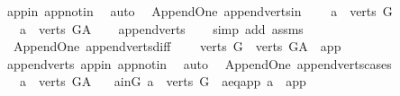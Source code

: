 \begin{isabellebody}
\ app{\isacharunderscore}{\kern0pt}in\ app{\isacharunderscore}{\kern0pt}notin\ \isamarkupfalse%
\ auto%
\endisatagproof
{\isafoldproof}%
%
\isadelimproof
\isanewline
%
\endisadelimproof
\isanewline
{}\isamarkupfalse%
\ {\isacharparenleft}{\kern0pt}\ Append{\isacharunderscore}{\kern0pt}One{\isacharparenright}{\kern0pt}\ append{\isacharunderscore}{\kern0pt}verts{\isacharunderscore}{\kern0pt}in{\isacharcolon}{\kern0pt}\ \isanewline
\ \ \ {\isachardoublequoteopen}a\ {\isasymin}\ verts\ G{\isachardoublequoteclose}\isanewline
\ \ \ {\isachardoublequoteopen}a\ {\isasymin}\ verts\ G{\isacharunderscore}{\kern0pt}A{\isachardoublequoteclose}\isanewline
%
\isadelimproof
\ \ %
\endisadelimproof
%
\isatagproof
{}\isamarkupfalse%
\ append{\isacharunderscore}{\kern0pt}verts\isanewline
\ \ \isamarkupfalse%
\ {\isacharparenleft}{\kern0pt}simp\ add{\isacharcolon}{\kern0pt}\ assms{\isacharparenright}{\kern0pt}%
\endisatagproof
{\isafoldproof}%
%
\isadelimproof
\ \isanewline
%
\endisadelimproof
\isanewline
{}\isamarkupfalse%
\ {\isacharparenleft}{\kern0pt}\ Append{\isacharunderscore}{\kern0pt}One{\isacharparenright}{\kern0pt}\ append{\isacharunderscore}{\kern0pt}verts{\isacharunderscore}{\kern0pt}diff{\isacharcolon}{\kern0pt}\ \isanewline
\ \ \ {\isachardoublequoteopen}verts\ G\ {\isacharequal}{\kern0pt}\ verts\ G{\isacharunderscore}{\kern0pt}A\ {\isacharminus}{\kern0pt}\ {\isacharbraceleft}{\kern0pt}app{\isacharbraceright}{\kern0pt}{\isachardoublequoteclose}\isanewline
%
\isadelimproof
\ \ %
\endisadelimproof
%
\isatagproof
{}\isamarkupfalse%
\ append{\isacharunderscore}{\kern0pt}verts\ app{\isacharunderscore}{\kern0pt}in\ app{\isacharunderscore}{\kern0pt}notin\ \isamarkupfalse%
\ auto%
\endisatagproof
{\isafoldproof}%
%
\isadelimproof
\isanewline
%
\endisadelimproof
\isanewline
{}\isamarkupfalse%
\ {\isacharparenleft}{\kern0pt}\ Append{\isacharunderscore}{\kern0pt}One{\isacharparenright}{\kern0pt}\ append{\isacharunderscore}{\kern0pt}verts{\isacharunderscore}{\kern0pt}cases{\isacharcolon}{\kern0pt}\ \isanewline
\ \ \ {\isachardoublequoteopen}a\ {\isasymin}\ verts\ G{\isacharunderscore}{\kern0pt}A{\isachardoublequoteclose}\isanewline
\ \ \ {\isacharparenleft}{\kern0pt}a{\isacharunderscore}{\kern0pt}in{\isacharunderscore}{\kern0pt}G{\isacharparenright}{\kern0pt}\ {\isachardoublequoteopen}a\ {\isasymin}\ verts\ G{\isachardoublequoteclose}\ {\isacharbar}{\kern0pt}\ {\isacharparenleft}{\kern0pt}a{\isacharunderscore}{\kern0pt}eq{\isacharunderscore}{\kern0pt}app{\isacharparenright}{\kern0pt}\ {\isachardoublequoteopen}a\ {\isacharequal}{\kern0pt}\ app{\isachardoublequoteclose}\isanewline

\end{isabellebody}
